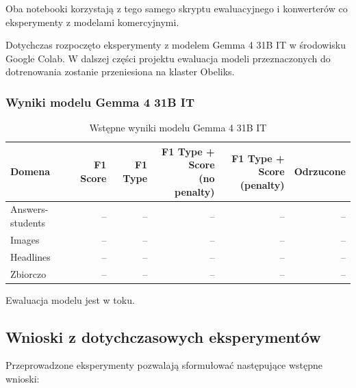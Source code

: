 \documentclass[a4paper,10pt]{article}
\begin{document}
Oba notebooki korzystają z tego samego skryptu
ewaluacyjnego i konwerterów co eksperymenty
z modelami komercyjnymi.

Dotychczas rozpoczęto eksperymenty z modelem
Gemma 4 31B IT w środowisku Google Colab.
W dalszej części projektu ewaluacja modeli
przeznaczonych do dotrenowania zostanie przeniesiona
na klaster Obeliks.


\subsubsection{Wyniki modelu Gemma 4 31B IT}


\begin{table}[htbp]
    \centering
    \small
    \caption{Wstępne wyniki modelu Gemma 4 31B IT}
    \label{tab:gemma_baseline}
    \begin{tabular}{lrrrrr}
        \toprule
        Domena
        & F1 Score
        & F1 Type
        & \shortstack{F1 Type + Score\\(no penalty)}
        & \shortstack{F1 Type + Score\\(penalty)}
        & Odrzucone \\
        \midrule
        Answers-students & -- & -- & -- & -- & -- \\
        Images           & -- & -- & -- & -- & -- \\
        Headlines        & -- & -- & -- & -- & -- \\
        \midrule
        Zbiorczo         & -- & -- & -- & -- & -- \\
        \bottomrule
    \end{tabular}
\end{table}

Ewaluacja modelu jest w toku.


\subsection{Wnioski z dotychczasowych eksperymentów}

Przeprowadzone eksperymenty pozwalają sformułować
następujące wstępne wnioski:
\end{document}
